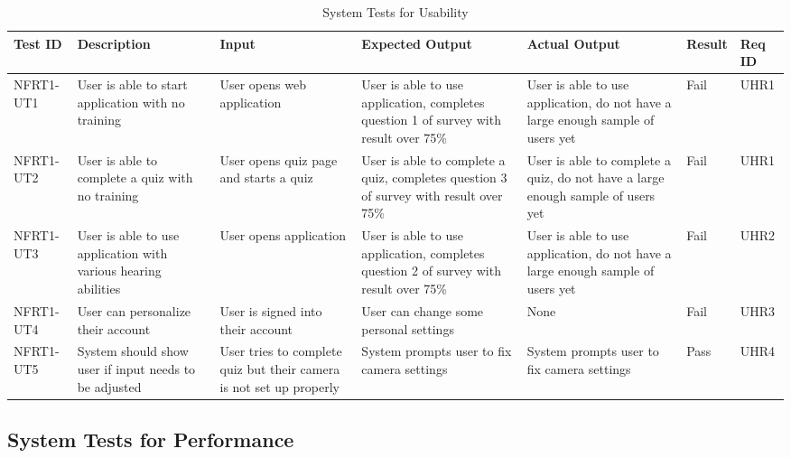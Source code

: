 \documentclass[12pt, titlepage]{article}
\begin{document}
\begin{longtable}{|p{1.5cm}|p{2.5cm}|p{2cm}|p{2cm}|p{2cm}|p{1.5cm}|p{1.5cm}|}
\caption{System Tests for Usability} \\
\hline
\textbf{Test ID} & \textbf{Description} & \textbf{Input} & \textbf{Expected Output} & \textbf{Actual Output} & \textbf{Result} & \textbf{Req ID}\\
\hline
NFRT1-UT1 & User is able to start application with no training & User opens web application & User is able to use application, completes question 1 of survey with result over 75\% & User is able to use application, do not have a large enough sample of users yet & Fail & UHR1 \\
\hline
NFRT1-UT2 & User is able to complete a quiz with no training & User opens quiz page and starts a quiz & User is able to complete a quiz, completes question 3 of survey with result over 75\% & User is able to complete a quiz, do not have a large enough sample of users yet & Fail & UHR1 \\
\hline
NFRT1-UT3 & User is able to use application with various hearing abilities & User opens application & User is able to use application, completes question 2 of survey with result over 75\% & User is able to use application, do not have a large enough sample of users yet & Fail & UHR2 \\
\hline
NFRT1-UT4 & User can personalize their account & User is signed into their account & User can change some personal settings & None & Fail & UHR3 \\
\hline
NFRT1-UT5 & System should show user if input needs to be adjusted & User tries to complete quiz but their camera is not set up properly & System prompts user to fix camera settings & System prompts user to fix camera settings & Pass & UHR4 \\
\bottomrule
\end{longtable}
		
\subsection{System Tests for Performance}
\end{document}
